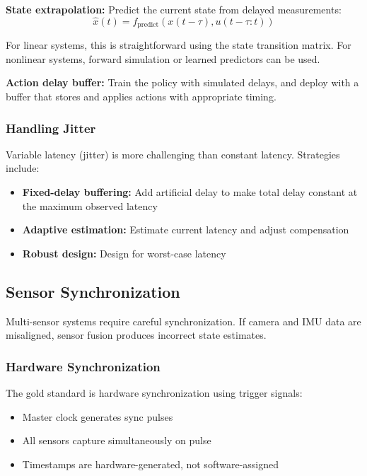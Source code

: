 \textbf{State extrapolation:} Predict the current state from delayed measurements:
\begin{equation}
\hat{x}(t) = f_{\text{predict}}(x(t-\tau), u(t-\tau:t))
\end{equation}

For linear systems, this is straightforward using the state transition matrix. For nonlinear systems, forward simulation or learned predictors can be used.

\textbf{Action delay buffer:} Train the policy with simulated delays, and deploy with a buffer that stores and applies actions with appropriate timing.

\subsubsection{Handling Jitter}

Variable latency (jitter) is more challenging than constant latency. Strategies include:

\begin{itemize}
    \item \textbf{Fixed-delay buffering:} Add artificial delay to make total delay constant at the maximum observed latency
    \item \textbf{Adaptive estimation:} Estimate current latency and adjust compensation
    \item \textbf{Robust design:} Design for worst-case latency
\end{itemize}

\subsection{Sensor Synchronization}

Multi-sensor systems require careful synchronization. If camera and IMU data are misaligned, sensor fusion produces incorrect state estimates.

\subsubsection{Hardware Synchronization}

The gold standard is hardware synchronization using trigger signals:
\begin{itemize}
    \item Master clock generates sync pulses
    \item All sensors capture simultaneously on pulse
    \item Timestamps are hardware-generated, not software-assigned
\end{itemize}

